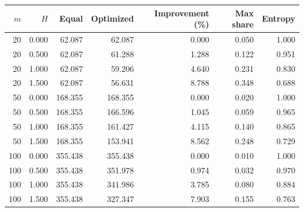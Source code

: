\begin{tabular}{rrrrrrr}
\toprule
$m$ & $H$ & Equal & Optimized & Improvement (\%) & Max share & Entropy \\
\midrule
20 & 0.000 & 62.087 & 62.087 & 0.000 & 0.050 & 1.000 \\
20 & 0.500 & 62.087 & 61.288 & 1.288 & 0.122 & 0.951 \\
20 & 1.000 & 62.087 & 59.206 & 4.640 & 0.231 & 0.830 \\
20 & 1.500 & 62.087 & 56.631 & 8.788 & 0.348 & 0.688 \\
50 & 0.000 & 168.355 & 168.355 & 0.000 & 0.020 & 1.000 \\
50 & 0.500 & 168.355 & 166.596 & 1.045 & 0.059 & 0.965 \\
50 & 1.000 & 168.355 & 161.427 & 4.115 & 0.140 & 0.865 \\
50 & 1.500 & 168.355 & 153.941 & 8.562 & 0.248 & 0.729 \\
100 & 0.000 & 355.438 & 355.438 & 0.000 & 0.010 & 1.000 \\
100 & 0.500 & 355.438 & 351.978 & 0.974 & 0.032 & 0.970 \\
100 & 1.000 & 355.438 & 341.986 & 3.785 & 0.080 & 0.884 \\
100 & 1.500 & 355.438 & 327.347 & 7.903 & 0.155 & 0.763 \\
\bottomrule
\end{tabular}
